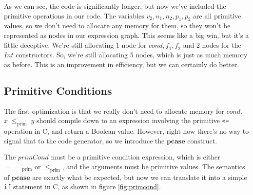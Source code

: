 \documentclass{book}
\theoremstyle{definition}
\newcommand{\Conid}[1]{\mathit{#1}}
\newcommand{\Varid}[1]{\mathit{#1}}
\renewcommand{\leq}{\leqslant}
\begin{document}
As we can see, the code is significantly longer,
but now we've included the primitive operations in our code.
The variables \ensuremath{\Varid{v}_{\mathrm{2}},\Varid{n}_{\mathrm{1}},\Varid{n}_{\mathrm{2}},\Varid{p}_{\mathrm{1}},\Varid{p}_{\mathrm{2}}} are all primitive values, so we don't need to allocate
any memory for them, so they won't be represented as nodes in our expression graph.
This seems like a big win, but it's a little deceptive.
We're still allocating 1 node for \ensuremath{\Varid{cond},\Varid{f}_{\mathrm{1}},\Varid{f}_{\mathrm{2}}} and 2 nodes for the \ensuremath{\Conid{Int}} constructors.
So, we're still allocating 5 nodes, which is just as much memory as before.
This is an improvement in efficiency, but we can certainly do better.

\subsection{Primitive Conditions}

The first optimization is that we really don't need to allocate memory for \ensuremath{\Varid{cond}}.
\ensuremath{\Varid{x}\;\leq _{\text{prim}}\;\Varid{y}} should compile down to an expression involving the primitive \texttt{<=} operation in C,
and return a Boolean value.
However, right now there's no way to signal that to the code generator,
so we introduce the \ensuremath{\textbf{pcase}} construct.

The \ensuremath{\Varid{primCond}} must be a primitive condition expression, which is either \ensuremath{\Varid{==}_{\text{prim}}} or \ensuremath{\leq _{\text{prim}}},
and the arguments must be primitive values.
The semantics of \ensuremath{\textbf{pcase}} are exactly what be expected,
but now we can translate it into a simple \texttt{if} 
statement in C, as shown in figure \ref{fig:primcond}.
\end{document}
